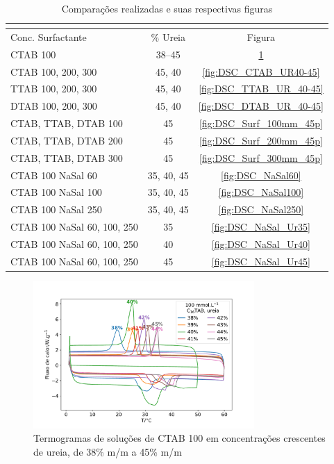 		\begin{longtable}[h]{l c c}
			\caption{Comparações realizadas e suas respectivas figuras} \\
			\label{tab:refs_DSC} \\
			\toprule
			\centering
			Conc. Surfactante \mM     & \% Ureia		& Figura 			\\
			\midrule
			\endhead
			CTAB 100	  & 38--45			& \ref{fig:DSC_CTAB_UR38-45}	\\*
			CTAB 100, 200, 300	& 45, 40	& \ref{fig:DSC_CTAB_UR40-45}	\\*
			TTAB 100, 200, 300	& 45, 40	& \ref{fig:DSC_TTAB_UR_40-45}	\\*
			DTAB 100, 200, 300	& 45, 40	& \ref{fig:DSC_DTAB_UR_40-45}	\\*
			CTAB, TTAB, DTAB 100	& 45	& \ref{fig:DSC_Surf_100mm_45p}	\\*
			CTAB, TTAB, DTAB 200	& 45	& \ref{fig:DSC_Surf_200mm_45p}	\\*
			CTAB, TTAB, DTAB 300	& 45	& \ref{fig:DSC_Surf_300mm_45p}	\\*
			\midrule
			CTAB 100 NaSal 60	& 35, 40, 45	& \ref{fig:DSC_NaSal60}		\\*
			CTAB 100 NaSal 100	& 35, 40, 45	& \ref{fig:DSC_NaSal100}	\\*
			CTAB 100 NaSal 250	& 35, 40, 45	& \ref{fig:DSC_NaSal250}	\\*
			CTAB 100 NaSal 60, 100, 250 & 35 	& \ref{fig:DSC_NaSal_Ur35}  \\*
			CTAB 100 NaSal 60, 100, 250 & 40	& \ref{fig:DSC_NaSal_Ur40}  \\*
			CTAB 100 NaSal 60, 100, 250	& 45	& \ref{fig:DSC_NaSal_Ur45}  \\*
			\bottomrule

		\end{longtable}
		
		\begin{figure}[h]
			\centering
			\includegraphics[width=0.75\textwidth]{./imagens/dsc/CTAB_porc_ur}
			\caption{Termogramas de soluções de CTAB 100 \mM{} em concentrações crescentes de ureia, de 38\% m/m a 45\% m/m}
			\label{fig:DSC_CTAB_UR38-45}
		\end{figure}
		
